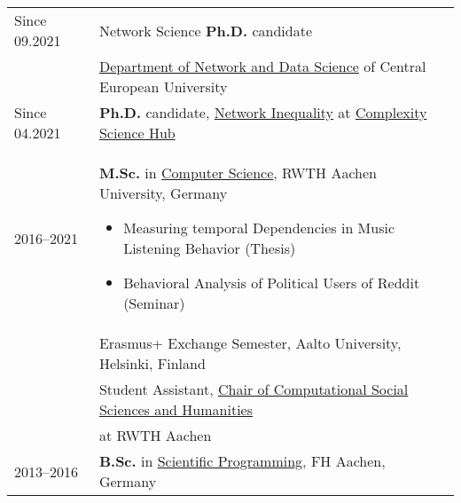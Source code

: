 


\begin{longtable}[l]{@{}p{} p{}}
    Since 09.2021 & Network Science \textbf{Ph.D.} candidate\\
                  & \href{https://networkdatascience.ceu.edu/}{Department of Network and Data Science} of Central European University \\

    Since 04.2021 & \textbf{Ph.D.} candidate, \href{https://networkinequality.com/}{Network Inequality} at \href{https://csh.ac.at}{Complexity Science Hub}~\cite{bachmann.etal_cumulativeadvantagebrokerage_2024,neuhauser.etal_improvingvisibilityminorities_2023}\\

    2016--2021 & \textbf{M.Sc.} in \href{https://www.informatik.rwth-aachen.de/}{Computer Science}, RWTH Aachen University, Germany\vspace{-1em}
               \begin{itemize}
                   \item Measuring temporal Dependencies in Music Listening Behavior (Thesis)\vspace{-1em}
                   \item Behavioral Analysis of Political Users of Reddit (Seminar)
               \end{itemize}\vspace{-2em}\\
               & Erasmus+ Exchange Semester, Aalto University, Helsinki, Finland\\
               & Student Assistant, \href{https://cssh.rwth-aachen.de/}{Chair of Computational Social Sciences and Humanities}\\
               & at RWTH Aachen~\cite{schumacher.etal_effectsrandomnessstability_2020}\\

    2013--2016 & \textbf{B.Sc.} in \href{https://www.fh-aachen.de/en/studies/degree-programmes/applied-mathematics-and-computer-science-dual-bsc}{Scientific Programming}, FH Aachen, Germany\\



\end{longtable}
